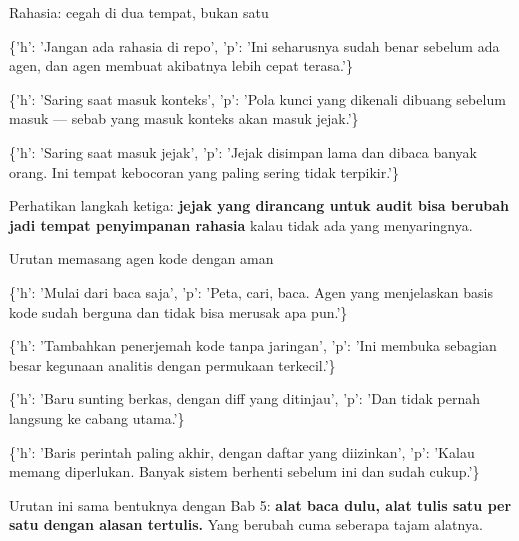 \documentclass[aspectratio=169,11pt,t]{beamer}
\begin{document}
\begin{frame}[shrink=25]{Rahasia: cegah di dua tempat, bukan satu}
\begin{isteps}
\item \{'h': 'Jangan ada rahasia di repo', 'p': 'Ini seharusnya sudah benar sebelum ada agen, dan agen membuat akibatnya lebih cepat terasa.'\}
\item \{'h': 'Saring saat masuk konteks', 'p': 'Pola kunci yang dikenali dibuang sebelum masuk --- sebab yang masuk konteks akan masuk jejak.'\}
\item \{'h': 'Saring saat masuk jejak', 'p': 'Jejak disimpan lama dan dibaca banyak orang. Ini tempat kebocoran yang paling sering tidak terpikir.'\}
\end{isteps}
\begin{iband}[signal]
Perhatikan langkah ketiga: \textbf{jejak yang dirancang untuk audit bisa berubah jadi tempat penyimpanan rahasia} kalau tidak ada yang menyaringnya.
\end{iband}
\end{frame}

\begin{frame}[shrink=25]{Urutan memasang agen kode dengan aman}
\begin{isteps}
\item \{'h': 'Mulai dari baca saja', 'p': 'Peta, cari, baca. Agen yang menjelaskan basis kode sudah berguna dan tidak bisa merusak apa pun.'\}
\item \{'h': 'Tambahkan penerjemah kode tanpa jaringan', 'p': 'Ini membuka sebagian besar kegunaan analitis dengan permukaan terkecil.'\}
\item \{'h': 'Baru sunting berkas, dengan diff yang ditinjau', 'p': 'Dan tidak pernah langsung ke cabang utama.'\}
\item \{'h': 'Baris perintah paling akhir, dengan daftar yang diizinkan', 'p': 'Kalau memang diperlukan. Banyak sistem berhenti sebelum ini dan sudah cukup.'\}
\end{isteps}
\begin{iband}[signal]
Urutan ini sama bentuknya dengan Bab 5: \textbf{alat baca dulu, alat tulis satu per satu dengan alasan tertulis.} Yang berubah cuma seberapa tajam alatnya.
\end{iband}
\end{frame}
\end{document}
